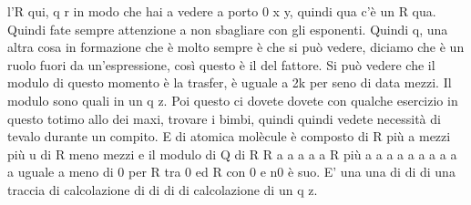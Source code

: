 {\begin{soluzione}
l'R qui, q r in modo che hai a vedere a porto 0 x y, quindi qua c'è un R qua. Quindi fate sempre attenzione a non sbagliare con gli esponenti. Quindi q, una altra cosa in formazione che è molto sempre è che si può vedere, diciamo che è un ruolo fuori da un'espressione, così questo è il del fattore. Si può vedere che il modulo di questo momento è la trasfer, è uguale a 2k per seno di data mezzi. Il modulo sono quali in un q z. Poi questo ci dovete dovete con qualche esercizio in questo totimo allo dei maxi, trovare i bimbi, quindi quindi vedete necessità di tevalo durante un compito. E di atomica molècule è composto di R più a mezzi più u di R meno mezzi e il modulo di Q di R R a a a a a R più a a a a a a a a a a uguale a meno di 0 per R tra 0 ed R con 0 e n0 è suo. E' una una di di di una traccia di calcolazione di di di di calcolazione di un q z.


\end{soluzione}}

